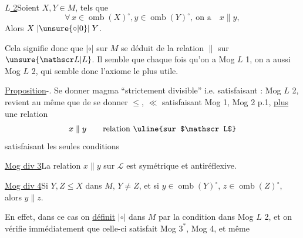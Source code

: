
\uline{ $L$ 2}\quad\unsure{$\checkmark$}\quad Soient $X,Y\in M$,  tels que
\[
\forall\,x\in\operatorname{omb}(X)^\circ,y\in\operatorname{omb}(Y)^\circ,\ \text{on a}\quad x\parallel y,
\]
Alors $X\mathrel{|\unsure{\circ|0}|}Y$.


Cela signifie donc que $\mathrel{|\circ|}$ sur $M$ se déduit de la  relation $\parallel$ sur $\unsure{\mathscr L|L}$. Il semble que  chaque fois qu'on a Mog $L$ 1, on a aussi Mog $L$ 2, qui semble donc l'axiome le plus utile.

\uline{Proposition}-\uline{}. Se donner    magma ``strictement divisible'' i.e. satisfaisant : Mog $L$ 2, revient au même que de se donner $\leq$, $\ll$ satisfaisant Mog 1, Mog 2 p.1,  \uline{plus} une relation
\[
x\parallel y\qquad\text{relation \uline{sur $\mathscr L$}}
\]
satisfaisant les seules conditions

\uline{Mog div 3}\quad La relation $x\parallel y$ sur $\mathscr L$ est symétrique et antiréflexive.

\uline{Mog div 4}\quad Si $Y,Z\leq X$ dans $M$, $Y\neq Z$, et si $y\in\operatorname{omb}(Y)^\circ$, $z\in\operatorname{omb}(Z)^\circ$, alors $y\parallel z$.

En effet, dans ce cas on \uline{définit} $\mathrel{|\circ|}$ dans $M$ par la condition dans Mog $L$ 2, et on vérifie immédiatement que  celle-ci satisfait Mog $3^*$, Mog 4, et même

